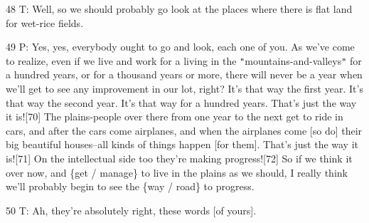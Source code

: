 {48 T: Well, so we should probably go look at the places where there is
flat land for wet-rice fields. }

{49 P: Yes, yes, everybody ought to go and look, each one of you. As we've
come to realize, even if we live and work for a living in the \texttt{"}mountains-and-valleys\texttt{"}
for a hundred years, or for a thousand years or more, there will never be a year
when we'll get to see any improvement in our lot, right? It's that way the first
year. It's that way the second year. It's that way for a hundred years. That's
just the way it is![70]  The plains-people over there from one year to the next
get to ride in cars, and after the cars come airplanes, and when the airplanes
come [so do] their big beautiful houses--all kinds of things happen [for them].
That's just the way it is![71] On the intellectual side too they're making progress![72]
So if we think it over now, and \{get / manage\} to live in the plains as we should,
I really think we'll probably begin to see the \{way / road\} to progress. }

{50 T: Ah, they're absolutely right, these words [of yours]. }

